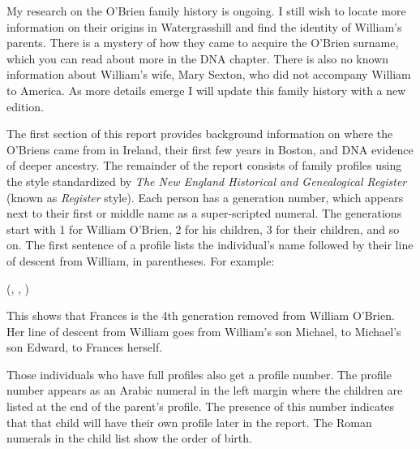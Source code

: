 My research on the O'Brien family history is ongoing. I still wish to locate more information on their origins in Watergrasshill and find the identity of William's parents. There is a mystery of how they came to acquire the O'Brien surname, which you can read about more in the DNA chapter. There is also no known information about William's wife, Mary Sexton, who did not accompany William to America. As more details emerge I will update this family history with a new edition.

The first section of this report provides background information on where the O'Briens came from in Ireland, their first few years in Boston, and DNA evidence of deeper ancestry. The remainder of the report consists of family profiles using the style standardized by \textit{The New England Historical and Genealogical Register} (known as \textit{Register} style). Each person has a generation number, which appears next to their first or middle name as a super-scripted numeral. The generations start with 1 for William O'Brien, 2 for his children, 3 for their children, and so on. The first sentence of a profile lists the individual's name followed by their line of descent from William, in parentheses. For example:

\vspace{\baselineskip}
 (, , )
\vspace{\baselineskip}

This shows that Frances is the 4th generation removed from William O'Brien. Her line of descent from William goes from William's son Michael, to Michael's son Edward, to Frances herself.

Those individuals who have full profiles also get a profile number. The profile number appears as an Arabic numeral in the left margin where the children are listed at the end of the parent's profile. The presence of this number indicates that that child will have their own profile later in the report. The Roman numerals in the child list show the order of birth. 

